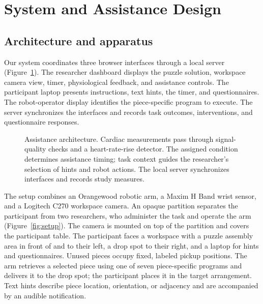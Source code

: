 \documentclass[sigconf]{aamas}
\begin{document}
\section{System and Assistance Design}

\subsection{Architecture and apparatus}

Our system coordinates three browser interfaces through a local server (Figure~\ref{fig:architecture}). The researcher dashboard displays the puzzle solution, workspace camera view, timer, physiological feedback, and assistance controls. The participant laptop presents instructions, text hints, the timer, and questionnaires. The robot-operator display identifies the piece-specific program to execute. The server synchronizes the interfaces and records task outcomes, interventions, and questionnaire responses.

\begin{figure}[t]
\centering
\begingroup
\resizebox{.96\textwidth}{!}{}
\endgroup
\caption{Assistance architecture. Cardiac measurements pass through signal-quality checks and a heart-rate-rise detector. The assigned condition determines assistance timing; task context guides the researcher’s selection of hints and robot actions. The local server synchronizes interfaces and records study measures.}
\label{fig:architecture}
\end{figure}

The setup combines an Orangewood robotic arm, a Maxim H Band wrist sensor, and a Logitech C270 workspace camera. An opaque partition separates the participant from two researchers, who administer the task and operate the arm (Figure~\ref{fig:setup}). The camera is mounted on top of the partition and covers the participant table. The participant faces a workspace with a puzzle assembly area in front of and to their left, a drop spot to their right, and a laptop for hints and questionnaires. Unused pieces occupy fixed, labeled pickup positions. The arm retrieves a selected piece using one of seven piece-specific programs and delivers it to the drop spot; the participant places it in the target arrangement. Text hints describe piece location, orientation, or adjacency and are accompanied by an audible notification.
\end{document}
